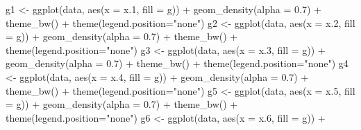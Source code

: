 \documentclass[
]{article}
\newenvironment{Shaded}{\begin{snugshade}}{\end{snugshade}}
\newcommand{\AttributeTok}[1]{\textcolor[rgb]{0.77,0.63,0.00}{#1}}
\newcommand{\FloatTok}[1]{\textcolor[rgb]{0.00,0.00,0.81}{#1}}
\newcommand{\FunctionTok}[1]{\textcolor[rgb]{0.00,0.00,0.00}{#1}}
\newcommand{\NormalTok}[1]{#1}
\newcommand{\OtherTok}[1]{\textcolor[rgb]{0.56,0.35,0.01}{#1}}
\newcommand{\SpecialCharTok}[1]{\textcolor[rgb]{0.00,0.00,0.00}{#1}}
\newcommand{\StringTok}[1]{\textcolor[rgb]{0.31,0.60,0.02}{#1}}
\begin{document}
\begin{Shaded}
\begin{Highlighting}[]
\NormalTok{g1 }\OtherTok{\textless{}{-}} \FunctionTok{ggplot}\NormalTok{(data, }\FunctionTok{aes}\NormalTok{(}\AttributeTok{x =}\NormalTok{ x}\FloatTok{.1}\NormalTok{, }\AttributeTok{fill =}\NormalTok{ g)) }\SpecialCharTok{+}
  \FunctionTok{geom\_density}\NormalTok{(}\AttributeTok{alpha =} \FloatTok{0.7}\NormalTok{) }\SpecialCharTok{+} \FunctionTok{theme\_bw}\NormalTok{() }\SpecialCharTok{+}
    \FunctionTok{theme}\NormalTok{(}\AttributeTok{legend.position=}\StringTok{"none"}\NormalTok{)}
\NormalTok{g2 }\OtherTok{\textless{}{-}} \FunctionTok{ggplot}\NormalTok{(data, }\FunctionTok{aes}\NormalTok{(}\AttributeTok{x =}\NormalTok{ x}\FloatTok{.2}\NormalTok{, }\AttributeTok{fill =}\NormalTok{ g)) }\SpecialCharTok{+}
  \FunctionTok{geom\_density}\NormalTok{(}\AttributeTok{alpha =} \FloatTok{0.7}\NormalTok{) }\SpecialCharTok{+} \FunctionTok{theme\_bw}\NormalTok{() }\SpecialCharTok{+}
    \FunctionTok{theme}\NormalTok{(}\AttributeTok{legend.position=}\StringTok{"none"}\NormalTok{)}
\NormalTok{g3 }\OtherTok{\textless{}{-}} \FunctionTok{ggplot}\NormalTok{(data, }\FunctionTok{aes}\NormalTok{(}\AttributeTok{x =}\NormalTok{ x}\FloatTok{.3}\NormalTok{, }\AttributeTok{fill =}\NormalTok{ g)) }\SpecialCharTok{+}
  \FunctionTok{geom\_density}\NormalTok{(}\AttributeTok{alpha =} \FloatTok{0.7}\NormalTok{) }\SpecialCharTok{+} \FunctionTok{theme\_bw}\NormalTok{() }\SpecialCharTok{+}
    \FunctionTok{theme}\NormalTok{(}\AttributeTok{legend.position=}\StringTok{"none"}\NormalTok{)}
\NormalTok{g4 }\OtherTok{\textless{}{-}} \FunctionTok{ggplot}\NormalTok{(data, }\FunctionTok{aes}\NormalTok{(}\AttributeTok{x =}\NormalTok{ x}\FloatTok{.4}\NormalTok{, }\AttributeTok{fill =}\NormalTok{ g)) }\SpecialCharTok{+}
  \FunctionTok{geom\_density}\NormalTok{(}\AttributeTok{alpha =} \FloatTok{0.7}\NormalTok{) }\SpecialCharTok{+} \FunctionTok{theme\_bw}\NormalTok{() }\SpecialCharTok{+}
    \FunctionTok{theme}\NormalTok{(}\AttributeTok{legend.position=}\StringTok{"none"}\NormalTok{)}
\NormalTok{g5 }\OtherTok{\textless{}{-}} \FunctionTok{ggplot}\NormalTok{(data, }\FunctionTok{aes}\NormalTok{(}\AttributeTok{x =}\NormalTok{ x}\FloatTok{.5}\NormalTok{, }\AttributeTok{fill =}\NormalTok{ g)) }\SpecialCharTok{+}
  \FunctionTok{geom\_density}\NormalTok{(}\AttributeTok{alpha =} \FloatTok{0.7}\NormalTok{) }\SpecialCharTok{+} \FunctionTok{theme\_bw}\NormalTok{() }\SpecialCharTok{+}
    \FunctionTok{theme}\NormalTok{(}\AttributeTok{legend.position=}\StringTok{"none"}\NormalTok{)}
\NormalTok{g6 }\OtherTok{\textless{}{-}} \FunctionTok{ggplot}\NormalTok{(data, }\FunctionTok{aes}\NormalTok{(}\AttributeTok{x =}\NormalTok{ x}\FloatTok{.6}\NormalTok{, }\AttributeTok{fill =}\NormalTok{ g)) }\SpecialCharTok{+}

\end{Highlighting}
\end{Shaded}
\end{document}
